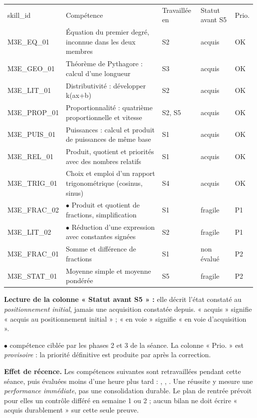 \documentclass[10pt,a4paper]{article}
\begin{document}
\par\noindent\begin{tabularx}{\linewidth}{>{\ttfamily\scriptsize}p{27mm} X >{\scriptsize}p{16mm} >{\scriptsize}p{20mm} >{\scriptsize\centering\arraybackslash}p{9mm}}
\rowcolor{Navy}\color{white}\scriptsize skill\_id & \color{white}Compétence & \color{white}Travaillée en & \color{white}Statut avant S5 & \color{white}Prio. \\
M3E\_EQ\_01 & Équation du premier degré, inconnue dans les deux membres & S2 & acquis & OK \\
M3E\_GEO\_01 & Théorème de Pythagore : calcul d'une longueur & S3 & acquis & OK \\
M3E\_LIT\_01 & Distributivité : développer k(ax+b) & S2 & acquis & OK \\
M3E\_PROP\_01 & Proportionnalité : quatrième proportionnelle et vitesse & S2, S5 & acquis & OK \\
M3E\_PUIS\_01 & Puissances : calcul et produit de puissances de même base & S1 & acquis & OK \\
M3E\_REL\_01 & Produit, quotient et priorités avec des nombres relatifs & S1 & acquis & OK \\
M3E\_TRIG\_01 & Choix et emploi d'un rapport trigonométrique (cosinus, sinus) & S4 & acquis & OK \\
M3E\_FRAC\_02 & $\bullet$ Produit et quotient de fractions, simplification & S1 & fragile & P1 \\
M3E\_LIT\_02 & $\bullet$ Réduction d'une expression avec constantes signées & S2 & fragile & P1 \\
M3E\_FRAC\_01 & Somme et différence de fractions & S1 & non évalué & P2 \\
M3E\_STAT\_01 & Moyenne simple et moyenne pondérée & S5 & fragile & P2 \\
\end{tabularx}
\par\vspace{1mm}\small\textbf{Lecture de la colonne « Statut avant S5 » :} elle décrit l'état constaté au \emph{positionnement initial}, jamais une acquisition constatée depuis. « acquis » signifie « acquis au positionnement initial » ; « en voie » signifie « en voie d'acquisition ».
\par\small$\bullet$ compétence ciblée par les phases 2 et 3 de la séance. La colonne « Prio. » est \emph{provisoire} : la priorité définitive est produite par  après la correction.
\begin{warningbox}\textbf{Effet de récence.} Les compétences suivantes sont retravaillées pendant cette séance, puis évaluées moins d'une heure plus tard : , , . Une réussite y mesure une \emph{performance immédiate}, pas une consolidation durable. Le plan de rentrée prévoit pour elles un contrôle différé en semaine 1 ou 2 ; aucun bilan ne doit écrire « acquis durablement » sur cette seule preuve.\end{warningbox}
\end{document}
